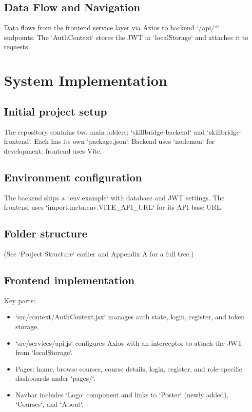 \documentclass[12pt,a4paper]{report}
\begin{document}
\section{Data Flow and Navigation}
Data flows from the frontend service layer via Axios to backend `/api/*` endpoints. The `AuthContext` stores the JWT in `localStorage` and attaches it to requests.

\clearpage

\chapter{System Implementation}
\section{Initial project setup}
The repository contains two main folders: `skillbridge-backend` and `skillbridge-frontend`. Each has its own `package.json`. Backend uses `nodemon` for development; frontend uses Vite.

\section{Environment configuration}
The backend ships a `.env.example` with database and JWT settings. The frontend uses `import.meta.env.VITE_API_URL` for its API base URL.

\section{Folder structure}
(See `Project Structure` earlier and Appendix A for a full tree.)

\section{Frontend implementation}
Key parts:
\begin{itemize}
  \item `src/context/AuthContext.jsx` manages auth state, login, register, and token storage.
  \item `src/services/api.js` configures Axios with an interceptor to attach the JWT from `localStorage`.
  \item Pages: home, browse courses, course details, login, register, and role-specific dashboards under `pages/`.
  \item Navbar includes `Logo` component and links to `Poster` (newly added), `Courses`, and `About`.
\end{itemize}
\end{document}
